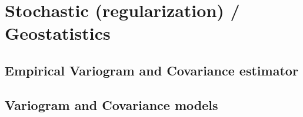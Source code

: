 \section{Stochastic (regularization) / Geostatistics}\label{sect:crtomo_sto}
\subsection{Empirical Variogram and Covariance estimator}\label{sub:crtomo_sto_empvar}
\subsection{Variogram and Covariance models}\label{sub:crtomo_sto_var}
